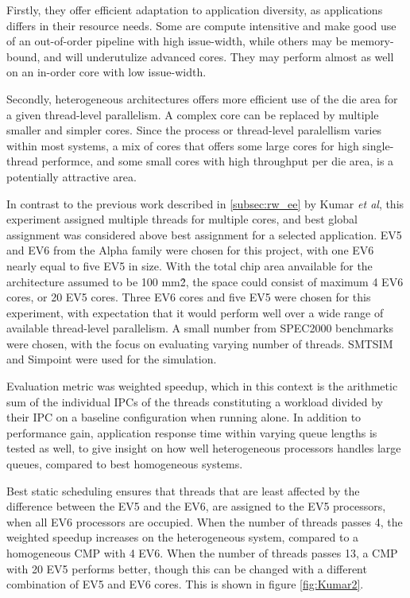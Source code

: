 Firstly, they offer efficient adaptation to application diversity, as applications differs in their resource needs.
Some are compute intensitive and make good use of an out-of-order pipeline with high issue-width, while others may be memory-bound, and will underutulize advanced cores.
They may perform almost as well on an in-order core with low issue-width\cite{heterogeneous-perf}.

Secondly, heterogeneous architectures offers more efficient use of the die area for a given thread-level parallelism.
A complex core can be replaced by multiple smaller and simpler cores. 
Since the process or thread-level paralellism varies within most systems, a mix of cores that offers some large cores for high single-thread performce, and some small cores with high throughput per die area, is a potentially attractive area. \cite{heterogeneous-perf}

In contrast to the previous work described in \ref{subsec:rw_ee} by Kumar \textit{et al}, this experiment assigned multiple threads for multiple cores, and best global assignment was considered above best assignment for a selected application.
EV5 and EV6 from the Alpha family were chosen for this project, with one EV6 nearly equal to five EV5 in size.
With the total chip area anvailable for the architecture assumed to be 100 mm\^2, the space could consist of maximum 4 EV6 cores, or 20 EV5 cores.
Three EV6 cores and five EV5 were chosen for this experiment, with expectation that it would perform well over a wide range of available thread-level parallelism. 
A small number from SPEC2000 benchmarks were chosen, with the focus on evaluating varying number of threads.
SMTSIM and Simpoint were used for the simulation.

Evaluation metric was weighted speedup, which in this context is the arithmetic sum of the individual IPCs of the threads constituting a workload divided by their IPC on a baseline configuration when running alone.
In addition to performance gain, application response time within varying queue lengths is tested as well, to give insight on how well heterogeneous processors handles large queues, compared to best homogeneous systems.

Best static scheduling ensures that threads that are least affected by the difference between the EV5 and the EV6, are assigned to the EV5 processors, when all EV6 processors are occupied.
When the number of threads passes 4, the weighted speedup increases on the heterogeneous system, compared to a homogeneous CMP with 4 EV6.
When the number of threads passes 13, a CMP with 20 EV5 performs better, though this can be changed with a different combination of EV5 and EV6 cores.
This is shown in figure \ref{fig:Kumar2}.


